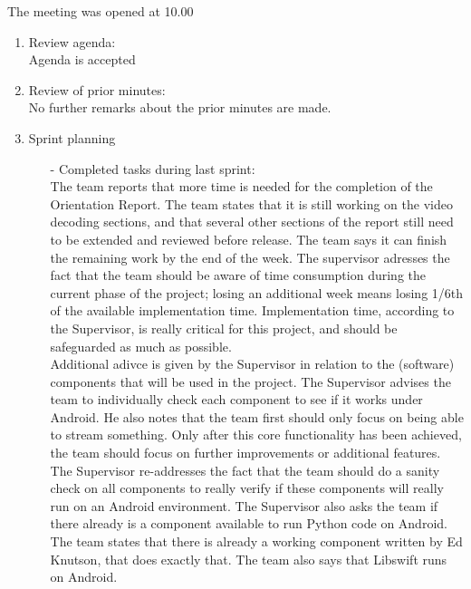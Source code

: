\documentclass[pdftex, 12pt, a4paper]{report}
\begin{document}
\pagestyle{fancy}

The meeting was opened at 10.00

\begin{enumerate}
\item Review agenda:\\		
Agenda is accepted

\item Review of prior minutes:\\		
No further remarks about the prior minutes are made.

\item Sprint planning\\
\begin{enumerate}
\item[-] Completed tasks during last sprint:\\
The team reports that more time is needed for the completion of the Orientation Report. The team states that it is still working on the video decoding sections, and that several other sections of the report still need to be extended and reviewed before release. The team says it can finish the remaining work by the end of the week. The supervisor adresses the fact that the team should be aware of time consumption during the current phase of the project; losing an additional week means losing 1/6th of the available implementation time. Implementation time, according to the Supervisor, is really critical for this project, and should be safeguarded as much as possible.\\

Additional adivce is given by the Supervisor in relation to the (software) components that will be used in the project. The Supervisor advises the team to individually check each component to see if it works under Android. He also notes that the team first should only focus on being able to stream something. Only after this core functionality has been achieved, the team should focus on further improvements or additional features.\\

The Supervisor re-addresses the fact that the team should do a sanity check on all components to really verify if these components will really run on an Android environment. The Supervisor also asks the team if there already is a component available to run Python code on Android. The team states that there is already a working component written by Ed Knutson, that does exactly that. The team also says that Libswift runs on Android.\\


\end{enumerate}
\end{enumerate}
\end{document}
